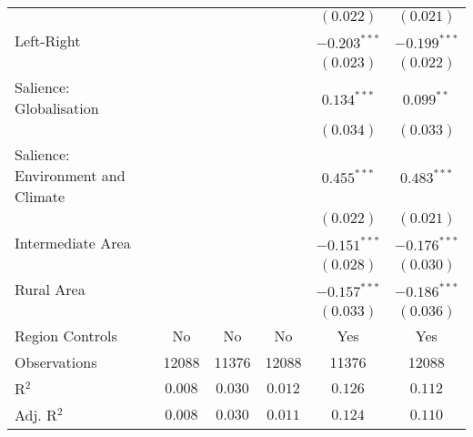 \begin{center}
\begin{tiny}
\begin{longtable}{l@{} c@{} c@{} c@{} c@{} c@{}}
                                        &                &                &                & $(0.022)$      & $(0.021)$        \\
\quad Left-Right                        &                &                &                & $-0.203^{***}$ & $-0.199^{***}$   \\
                                        &                &                &                & $(0.023)$      & $(0.022)$        \\
\quad Salience: Globalisation           &                &                &                & $0.134^{***}$  & $0.099^{**}$     \\
                                        &                &                &                & $(0.034)$      & $(0.033)$        \\
\quad Salience: Environment and Climate &                &                &                & $0.455^{***}$  & $0.483^{***}$    \\
                                        &                &                &                & $(0.022)$      & $(0.021)$        \\
\quad Intermediate Area                 &                &                &                & $-0.151^{***}$ & $-0.176^{***}$   \\
                                        &                &                &                & $(0.028)$      & $(0.030)$        \\
\quad Rural Area                        &                &                &                & $-0.157^{***}$ & $-0.186^{***}$   \\
                                        &                &                &                & $(0.033)$      & $(0.036)$        \\
\hline
Region Controls                         & No             & No             & No             & Yes            & Yes              \\
Observations                            & 12088          & 11376          & 12088          & 11376          & 12088            \\
R$^2$                                   & $0.008$        & $0.030$        & $0.012$        & $0.126$        & $0.112$          \\
Adj. R$^2$                              & $0.008$        & $0.030$        & $0.011$        & $0.124$        & $0.110$          \\
\end{longtable}
\end{tiny}
\end{center}
